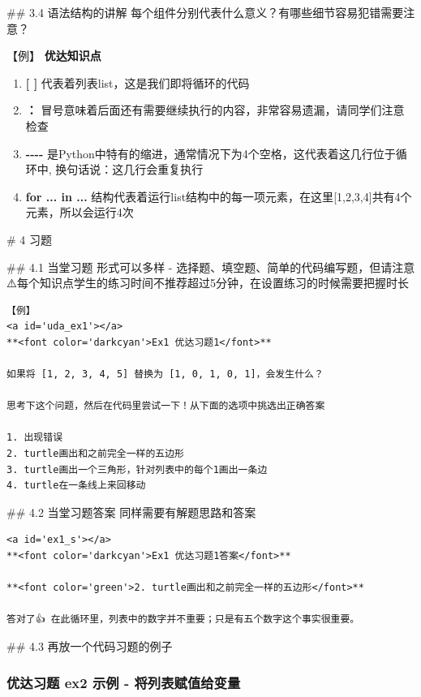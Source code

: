 \documentclass[11pt]{article}
\providecommand{\tightlist}{%
      \setlength{\itemsep}{0pt}\setlength{\parskip}{0pt}}
\begin{document}
     \#\# 3.4 语法结构的讲解
每个组件分别代表什么意义？有哪些细节容易犯错需要注意？

【例】 \textbf{优达知识点}

\begin{enumerate}
\def\labelenumi{\arabic{enumi}.}
\tightlist
\item
  \textbf{{[} {]}} 代表着列表list，这是我们即将循环的代码
\item
  \textbf{：}
  冒号意味着后面还有需要继续执行的内容，非常容易遗漏，请同学们注意检查
\item
  \textbf{-\/-\/-\/-}
  是Python中特有的缩进，通常情况下为4个空格，这代表着这几行位于循环中,
  换句话说：这几行会重复执行
\item
  \textbf{for ... in ...}
  结构代表着运行list结构中的每一项元素，在这里{[}1,2,3,4{]}共有4个元素，所以会运行4次
\end{enumerate}

     \# 4 习题

     \#\# 4.1 当堂习题 形式可以多样 -
选择题、填空题、简单的代码编写题，但请注意⚠️每个知识点学生的练习时间不推荐超过5分钟，在设置练习的时候需要把握时长

\begin{verbatim}
【例】
<a id='uda_ex1'></a>
**<font color='darkcyan'>Ex1 优达习题1</font>**

如果将 [1, 2, 3, 4, 5] 替换为 [1, 0, 1, 0, 1]，会发生什么？

思考下这个问题，然后在代码里尝试一下！从下面的选项中挑选出正确答案

1. 出现错误
2. turtle画出和之前完全一样的五边形
3. turtle画出一个三角形，针对列表中的每个1画出一条边
4. turtle在一条线上来回移动
\end{verbatim}

     \#\# 4.2 当堂习题答案 同样需要有解题思路和答案

\begin{verbatim}
<a id='ex1_s'></a>
**<font color='darkcyan'>Ex1 优达习题1答案</font>**

**<font color='green'>2. turtle画出和之前完全一样的五边形</font>**

答对了👍 在此循环里，列表中的数字并不重要；只是有五个数字这个事实很重要。
\end{verbatim}

     \#\# 4.3 再放一个代码习题的例子

    \subsubsection{优达习题 ex2 示例 -
将列表赋值给变量}\label{ux4f18ux8fbeux4e60ux9898-ex2-ux793aux4f8b---ux5c06ux5217ux8868ux8d4bux503cux7ed9ux53d8ux91cf}
\end{document}
